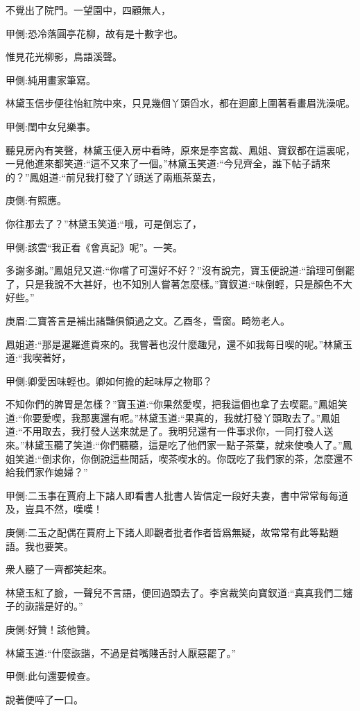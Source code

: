 \begin{parag}
    不覺出了院門。一望園中，四顧無人，\begin{note}甲側:恐冷落圓亭花柳，故有是十數字也。\end{note}惟見花光柳影，鳥語溪聲。\begin{note}甲側:純用畫家筆寫。\end{note}林黛玉信步便往怡紅院中來，只見幾個丫頭舀水，都在迴廊上圍著看畫眉洗澡呢。\begin{note}甲側:閨中女兒樂事。\end{note}聽見房內有笑聲，林黛玉便入房中看時，原來是李宮裁、鳳姐、寶釵都在這裏呢，一見他進來都笑道:“這不又來了一個。”林黛玉笑道:“今兒齊全，誰下帖子請來的？”鳳姐道:“前兒我打發了丫頭送了兩瓶茶葉去，\begin{note}庚側:有照應。\end{note}你往那去了？”林黛玉笑道:“哦，可是倒忘了，\begin{note}甲側:該雲“我正看《會真記》呢”。一笑。\end{note}多謝多謝。”鳳姐兒又道:“你嚐了可還好不好？”沒有說完，寶玉便說道:“論理可倒罷了，只是我說不大甚好，也不知別人嘗著怎麼樣。”寶釵道:“味倒輕，只是顏色不大好些。”\begin{note}庚眉:二寶答言是補出諸豔俱領過之文。乙酉冬，雪窗。畸笏老人。\end{note}鳳姐道:“那是暹羅進貢來的。我嘗著也沒什麼趣兒，還不如我每日喫的呢。”林黛玉道:“我喫著好，\begin{note}甲側:卿愛因味輕也。卿如何擔的起味厚之物耶？\end{note}不知你們的脾胃是怎樣？”寶玉道:“你果然愛喫，把我這個也拿了去喫罷。”鳳姐笑道:“你要愛喫，我那裏還有呢。”林黛玉道:“果真的，我就打發丫頭取去了。”鳳姐道:“不用取去，我打發人送來就是了。我明兒還有一件事求你，一同打發人送來。”林黛玉聽了笑道:“你們聽聽，這是吃了他們家一點子茶葉，就來使喚人了。”鳳姐笑道:“倒求你，你倒說這些閒話，喫茶喫水的。你既吃了我們家的茶，怎麼還不給我們家作媳婦？”\begin{note}甲側:二玉事在賈府上下諸人即看書人批書人皆信定一段好夫妻，書中常常每每道及，豈具不然，嘆嘆！\end{note}\begin{note}庚側:二玉之配偶在賈府上下諸人即觀者批者作者皆爲無疑，故常常有此等點題語。我也要笑。\end{note}衆人聽了一齊都笑起來。
\end{parag}


\begin{parag}
    林黛玉紅了臉，一聲兒不言語，便回過頭去了。李宮裁笑向寶釵道:“真真我們二嬸子的詼諧是好的。”\begin{note}庚側:好贊！該他贊。\end{note}林黛玉道:“什麼詼諧，不過是貧嘴賤舌討人厭惡罷了。”\begin{note}甲側:此句還要候查。\end{note}說著便啐了一口。
\end{parag}


